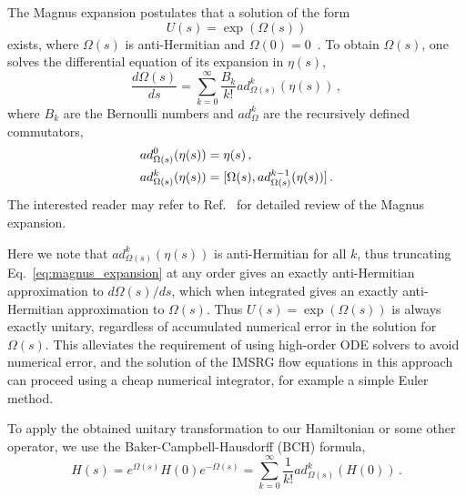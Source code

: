 The Magnus expansion postulates that a solution of the form
\begin{equation}
  U(s) = \exp(\Omega(s))
\end{equation}
exists, where $\Omega(s)$ is anti-Hermitian and $\Omega(0) = 0$~\cite{Magn54magnus}.
To obtain $\Omega(s)$, one solves the differential equation of its expansion in $\eta(s)$,
\begin{equation}\label{eq:magnus_expansion}
  \frac{d \Omega(s)}{ds} = \sum_{k=0}^{\infty} \frac{B_{k}}{k!} ad^{k}_{\Omega(s)}(\eta(s))\,,
\end{equation}
where $B_{k}$ are the Bernoulli numbers
and $ad^{k}_{\Omega}$ are the recursively defined commutators,
\begin{align}
  ad^{0}_{\Omega(s)}(\eta(s)) & = \eta(s)\,,                                         \\
  ad^{k}_{\Omega(s)}(\eta(s)) & = [\Omega(s), ad^{k-1}_{\Omega(s)}(\eta(s))]\,.
\end{align}
The interested reader may refer to Ref.~\cite{Blan09magnusreview} for detailed review
of the Magnus expansion.

Here we note that $ad^{k}_{\Omega(s)}(\eta(s))$ is anti-Hermitian for all $k$,
thus truncating Eq.~\eqref{eq:magnus_expansion} at any order
gives an exactly anti-Hermitian approximation to $d\Omega(s)/ds$,
which when integrated gives an exactly anti-Hermitian approximation to $\Omega(s)$.
Thus $U(s) = \exp(\Omega(s))$ is always exactly unitary,
regardless of accumulated numerical error in the solution for $\Omega(s)$.
This alleviates the requirement of using high-order ODE solvers to avoid numerical error,
and the solution of the IMSRG flow equations in this approach
can proceed using a cheap numerical integrator,
for example a simple Euler method.

To apply the obtained unitary transformation to our Hamiltonian or some other operator,
we use the Baker-Campbell-Hausdorff (BCH) formula,
\begin{equation}\label{eq:bch_formula}
  H(s) = e^{\Omega(s)} H(0) e^{-\Omega(s)} = \sum_{k=0}^{\infty} \frac{1}{k!} ad^{k}_{\Omega(s)}(H(0))\,.
\end{equation}

